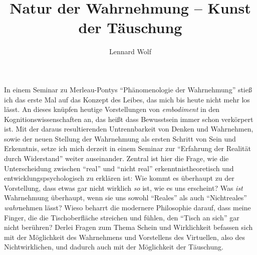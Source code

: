 \documentclass[a4paper]{article}
\date{\vspace{-2ex}}
\begin{document}
\title{Natur der Wahrnehmung – Kunst der Täuschung\vspace{-0.5ex}}

\author{Lennard Wolf}

\maketitle

In einem Seminar zu Merleau-Pontys "`Phänomenologie der Wahrnehmung"' stieß ich das erste Mal auf das Konzept des Leibes, das mich bis heute nicht mehr los lässt. An dieses knüpfen heutige Vorstellungen von \emph{embodiment} in den Kognitionswissenschaften an, das heißt dass Bewusstsein immer schon verkörpert ist. Mit der daraus resultierenden Untrennbarkeit von Denken und Wahrnehmen, sowie der neuen Stellung der Wahrnehmung als ersten Schritt von Sein und Erkenntnis, setze ich mich derzeit in einem Seminar zur "`Erfahrung der Realität durch Widerstand"' weiter auseinander. Zentral ist hier die Frage, wie die Unterscheidung zwischen "`real"' und "`nicht real"' erkenntnistheoretisch und entwicklungspsychologisch zu erklären ist: Wie kommt es überhaupt zu der Vorstellung, dass etwas gar nicht wirklich \emph{so} ist, wie es uns erscheint? Was \emph{ist} Wahrnehmung überhaupt, wenn sie uns sowohl "`Reales"' als auch "`Nichtreales"' \emph{wahr}nehmen lässt? Wieso beharrt die modernere Philosophie darauf, dass meine Finger, die die Tischoberfläche streichen und fühlen, den "`Tisch an sich"' gar nicht berühren? Derlei Fragen zum Thema Schein und Wirklichkeit befassen sich mit der Möglichkeit des Wahrnehmens und Vorstellens des Virtuellen, also des Nichtwirklichen, und dadurch auch mit der Möglichkeit der Täuschung.  
\end{document}
